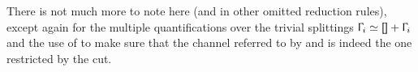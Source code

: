 \begin{AgdaAlign}
\begin{code}
\<%
\\
\>[.][@{}l@{}]\<[358I]%
\>[20]\AgdaSymbol{(}\AgdaSpace{}%
\AgdaSpace{}%
\AgdaSymbol{(}\AgdaSpace{}%
\AgdaSymbol{)}\AgdaSpace{}%
\AgdaSymbol{)}\<%
\\
%
\>[20]\AgdaSymbol{(}\AgdaSpace{}%
\AgdaSymbol{(}\AgdaSpace{}%
\AgdaSymbol{)}\AgdaSpace{}%
\AgdaSpace{}%
\AgdaSymbol{)}\AgdaSpace{}%
\AgdaSpace{}%
\AgdaSpace{}%
\AgdaSpace{}%
\AgdaSpace{}%
\AgdaSpace{}%
\<%
\end{code}

There is not much more to note here (and in other omitted reduction rules),
except again for the multiple quantifications over the trivial splittings
$\Context_i \simeq \AgdaInductiveConstructor{[]} + \Context_i$ and the use of
 to make sure that the channel referred to by
 and  is indeed
the one restricted by the cut.


\end{AgdaAlign}
